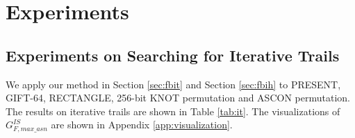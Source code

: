\section{Experiments\label{sec:experiment}}

\subsection{Experiments on Searching for Iterative Trails}

We apply our method in Section \ref{sec:fbit} and Section \ref{sec:fbih} to PRESENT, GIFT-64, RECTANGLE, 256-bit KNOT permutation and ASCON permutation. The results on iterative trails are shown in Table \ref{tab:it}. The visualizations of $G^{IS}_{F,max\_asn}$ are shown in Appendix \ref{app:visualization}.

